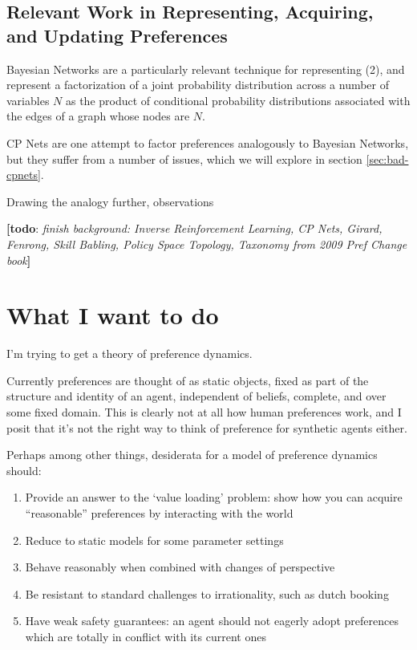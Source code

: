 \documentclass{article}
\theoremstyle{plain}
\theoremstyle{definition}
\theoremstyle{remark}
\newcommand{\todo}[1]{{\color{red}\large\textbf{[todo}: {\normalsize\itshape#1}\textbf{]}}}
\begin{document}
	\subsection*{Relevant Work in Representing, Acquiring, and Updating Preferences}
	
	
	Bayesian Networks are a particularly relevant technique for representing (2), and represent a factorization of a joint probability distribution across a number of variables $N$ as the product of conditional probability distributions associated with the edges of a graph whose nodes are $N$.	
	
	

	 CP Nets \cite{boutilier2004cp} are one attempt to factor preferences analogously to Bayesian Networks, but they suffer from a number of issues, which we will explore in section \ref{sec:bad-cpnets}. 
	
	
	Drawing the analogy further, observations 	
	
	\todo{finish background: Inverse Reinforcement Learning, CP Nets, Girard, Fenrong, Skill Babling, Policy Space Topology, Taxonomy from 2009 Pref Change book}
	
	
	
	\section{What I want to do}
	I'm trying to get a theory of preference dynamics.
	
	Currently preferences are thought of as static objects, fixed as part of the structure and identity of an agent, independent of beliefs, complete, and over some fixed domain. This is clearly not at all how human preferences work, and I posit that it's not the right way to think of preference for synthetic agents either.
	
	Perhaps among other things, desiderata for a model of preference dynamics should:
	\begin{enumerate}[noitemsep]
		\item Provide an answer to the `value loading' problem: show how you can acquire ``reasonable'' preferences by interacting with the world
		\item Reduce to static models for some parameter settings
		\item Behave reasonably when combined with changes of perspective 
		\item Be resistant to standard challenges to irrationality, such as dutch booking
		\item Have weak safety guarantees: an agent should not eagerly adopt preferences which are totally in conflict with its current ones
	\end{enumerate}
	
\end{document}

